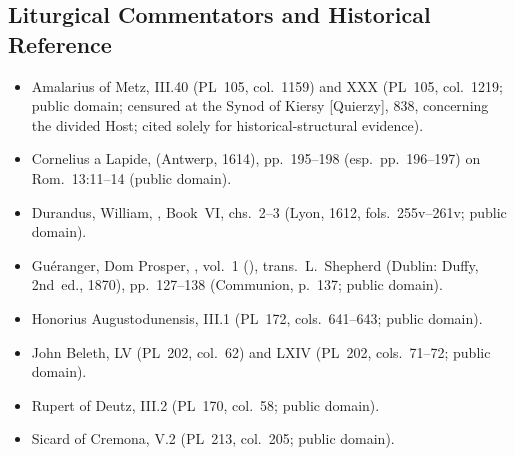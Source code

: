 \subsection*{Liturgical Commentators and Historical Reference}
\begin{itemize}
\item Amalarius of Metz,  III.40 (PL~105, col.~1159) and  XXX (PL~105, col.~1219; public domain; censured at the Synod of Kiersy [Quierzy], 838, concerning the divided Host; cited solely for historical-structural evidence).
\item Cornelius a Lapide,  (Antwerp, 1614), pp.~195--198 (esp.~pp.~196--197) on Rom.~13:11--14 (public domain).
\item Durandus, William, , Book~VI, chs.~2--3 (Lyon, 1612, fols.~255v--261v; public domain).
\item Gu\'eranger, Dom Prosper, , vol.~1 (), trans.\ L.~Shepherd (Dublin: Duffy, 2nd~ed., 1870), pp.~127--138 (Communion, p.~137; public domain).
\item Honorius Augustodunensis,  III.1 (PL~172, cols.~641--643; public domain).
\item John Beleth,  LV (PL~202, col.~62) and LXIV (PL~202, cols.~71--72; public domain).
\item Rupert of Deutz,  III.2 (PL~170, col.~58; public domain).
\item Sicard of Cremona,  V.2 (PL~213, col.~205; public domain).
\end{itemize}
